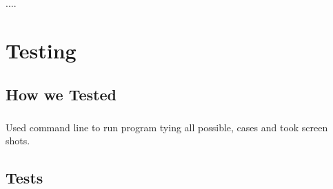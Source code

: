 \documentclass{report}
\begin{document}
			\paragraph{}....
		

\chapter{Testing}
	\section{How we Tested}
		\paragraph{}
Used command line to run program tying all possible, cases and took screen shots.
	\section{Tests}
\end{document}
